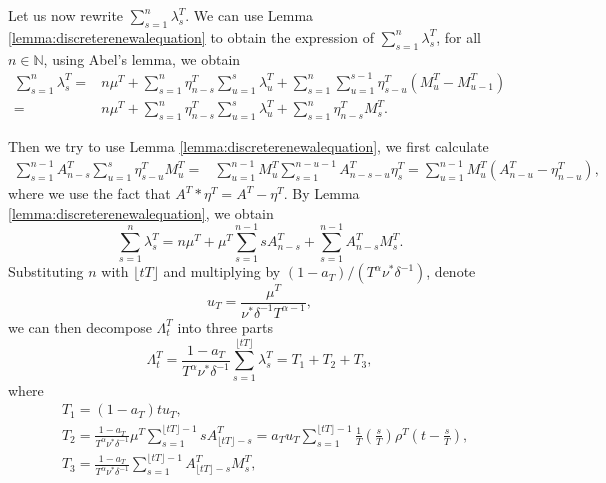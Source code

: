 \documentclass[letterpaper]{article}
\numberwithin{equation}{section}
\theoremstyle{definition}
\theoremstyle{remark}
\begin{document}
  Let us now rewrite $\sum_{s=1}^n\lambda_s^T$. We can use Lemma \ref{lemma:discreterenewalequation} to obtain the expression of $\sum_{s=1}^n\lambda_s^T$, for all $n\in \mathbb N$, using Abel's lemma, we obtain
  \begin{align*}
    \sum_{s=1}^n\lambda_s^T
    =&n\mu^T+\sum_{s=1}^n\eta_{n-s}^T\sum_{u=1}^{s}\lambda_u^T+\sum_{s=1}^n\sum_{u=1}^{s-1}\eta_{s-u}^T(M_u^T-M_{u-1}^T)\\
    =&n\mu^T+\sum_{s=1}^n\eta_{n-s}^T\sum_{u=1}^s\lambda_u^T+\sum_{s=1}^n\eta_{n-s}^TM_s^T.
  \end{align*}
  
  Then we try to use Lemma \ref{lemma:discreterenewalequation}, we first calculate
  \begin{align*}
    \sum_{s=1}^{n-1}A_{n-s}^T\sum_{u=1}^s\eta_{s-u}^TM_u^T
    =&\sum_{u=1}^{n-1}M_u^T\sum_{s=1}^{n-u-1}A_{n-s-u}^T\eta_s^T
    =\sum_{u=1}^{n-1}M_u^T(A_{n-u}^T-\eta_{n-u}^T),
  \end{align*}
  where we use the fact that $A^T*\eta^T=A^T-\eta^T$. By Lemma \ref{lemma:discreterenewalequation}, we obtain
  \[
    \sum_{s=1}^n\lambda_s^T=n\mu^T+\mu^T\sum_{s=1}^{n-1}sA_{n-s}^T+\sum_{s=1}^{n-1}A_{n-s}^TM_s^T.
  \]
  Substituting $n$ with $\lfloor tT \rfloor$ and multiplying by $(1-a_T)/(T^\alpha \nu^*\delta^{-1})$, denote
  \[
    u_T=\frac{\mu^T}{\nu^*\delta^{-1}T^{\alpha-1}},
  \]
  we can then decompose $\Lambda_t^T$ into three parts
  \[
    \Lambda_t^T=\frac{1-a_T}{T^\alpha \nu^*\delta^{-1}}\sum_{s=1}^{\lfloor tT \rfloor}\lambda_s^T=T_1+T_2+T_3,
  \]
  where
  \begin{align*}
    &T_1=(1-a_T)tu_T,\\
    &T_2=\frac{1-a_T}{T^\alpha \nu^*\delta^{-1}}\mu^T\sum_{s=1}^{\lfloor tT \rfloor-1}sA_{\lfloor tT \rfloor-s}^T
    =a_Tu_T\sum_{s=1}^{\lfloor tT \rfloor-1}\frac1T\left( \frac{s}{T} \right)\rho^T\left(t-\frac{s}{T}\right),\\
    &T_3=\frac{1-a_T}{T^\alpha \nu^*\delta^{-1}}\sum_{s=1}^{\lfloor tT \rfloor-1}A_{\lfloor tT \rfloor-s}^TM_s^T,
  \end{align*}
\end{document}
